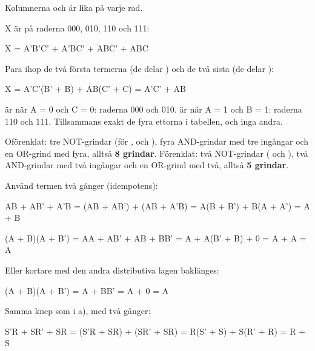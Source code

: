 \noindent Kolumnerna  och \mbox{} är lika på varje rad.

X är  på raderna 000, 010, 110 och 111:

\begin{console}
X = A'B'C' + A'BC' + ABC' + ABC
\end{console}

Para ihop de två första termerna (de delar ) och de två sista (de delar
):

\begin{console}
X = A'C'(B' + B) + AB(C' + C) = A'C' + AB
\end{console}

 är  när A = 0 och C = 0: raderna 000 och 010.  är  när
A = 1 och B = 1: raderna 110 och 111. Tillsammans exakt de fyra ettorna i tabellen, och inga andra.

Oförenklat: tre NOT-grindar (för ,  och ), fyra AND-grindar med tre
ingångar och en OR-grind med fyra, alltså \textbf{8 grindar}. Förenklat: två NOT-grindar
( och ), två AND-grindar med två ingångar och en OR-grind med två, alltså
\textbf{5 grindar}.

Använd termen  två gånger (idempotens):

\begin{console}
AB + AB' + A'B = (AB + AB') + (AB + A'B) = A(B + B') + B(A + A') = A + B
\end{console}

\leavevmode

\begin{console}
(A + B)(A + B') = AA + AB' + AB + BB' = A + A(B' + B) + 0 = A + A = A
\end{console}

\noindent Eller kortare med den andra distributiva lagen baklänges:

\begin{console}
(A + B)(A + B') = A + BB' = A + 0 = A
\end{console}

Samma knep som i a), med  två gånger:

\begin{console}
S'R + SR' + SR = (S'R + SR) + (SR' + SR) = R(S' + S) + S(R' + R) = R + S
\end{console}

